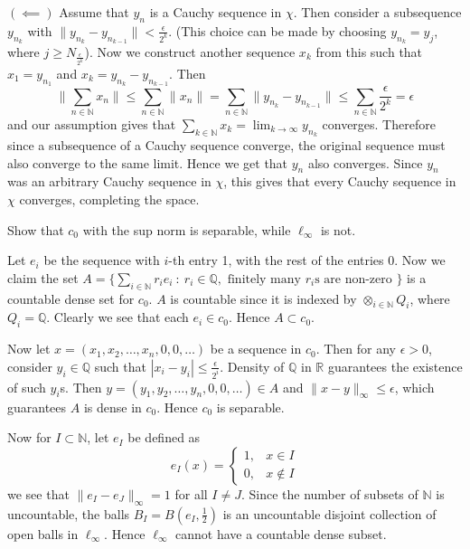 \documentclass[12pt]{exam}
\theoremstyle{plain} %
\theoremstyle{definition} %
\theoremstyle{remark} %
\begin{document}
\begin{questions}
\begin{solution}
    $(\impliedby)$ Assume that $y_n$ is a Cauchy sequence in $\chi$. Then consider a subsequence $y_{n_k}$ with $\|y_{n_{k}} - y_{n_{k-1}}\| < \frac{\epsilon}{2^k}$. (This choice can be made by choosing $y_{n_k} = y_j$, where $j \ge N_{\frac{\epsilon}{2^k}}$). Now we construct another sequence $x_k$ from this such that $ x_1 = y_{n_1}$ and $x_k = y_{n_k} - y_{n_{k-1}}$. Then \[
        \Big \|\sum_{n \in \mathbb{N}} x_n \Big\| \le \sum_{n \in \mathbb{N}} \|x_n\| = \sum_{n \in \mathbb{N}} \|y_{n_k} - y_{n_{k-1}}\| \le \sum_{n \in \mathbb{N}} \frac{\epsilon}{2^k} = \epsilon
    \]
     and our assumption gives that $\sum_{k \in \mathbb{N}} x_k = \lim_{k \to \infty} y_{n_k}$ converges. Therefore since a subsequence of a Cauchy sequence converge, the original sequence must also converge to the same limit. Hence we get that $y_n$ also converges. Since $y_n$ was an arbitrary Cauchy sequence in $\chi$, this gives that every Cauchy sequence in $ \chi$ converges, completing the space.
  \end{solution}

  \question
  Show that $c_0$ with the sup norm is separable, while $\ell_\infty$ is not.
  \begin{solution}
    Let $e_i$ be the sequence with $i$-th entry 1, with the rest of the entries $0$. Now we claim the set $A = \{ \sum_{i \in \mathbb{N}} r_i e_i \ : \ r_i \in \mathbb{Q}, \textrm{ finitely many $r_i$s are non-zero }\}$ is a countable dense set for $c_0$. $A$ is countable since it is indexed by $\otimes_{i \in \mathbb{N}} Q_i$, where $Q_i = \mathbb{Q}$. Clearly we see that each $e_i \in c_0$. Hence $A \subset c_0$. 

    Now let $x = (x_1, x_2, \ldots , x_n, 0, 0, \ldots)$ be a sequence in $c_0$. Then for any $\epsilon > 0$, consider $y_i \in \mathbb{Q}$ such that $|x_i - y_i| \le \frac{\epsilon}{2^i}$. Density of $\mathbb{Q}$ in $\mathbb{R}$ guarantees the existence of such $y_i$s. Then $y = (y_1, y_2, \ldots , y_n, 0, 0, \ldots) \in A$ and $\|x - y\|_\infty \le \epsilon$, which guarantees $A$ is dense in $c_0$. Hence $c_0$ is separable.

    Now for $I \subset \mathbb{N}$, let $e_I$ be defined as \[
      e_I(x) = \begin{cases}
        1, & x \in I \\ 
        0, & x \notin I
      \end{cases}
    \]
    we see that $\|e_I - e_J\|_\infty = 1$ for all $I \neq J$. Since the number of subsets of $\mathbb{N}$ is uncountable, the balls $B_I = B(e_I, \frac{1}{2})$ is an uncountable disjoint collection of open balls in $\ell_\infty$. Hence $\ell_\infty$ cannot have a countable dense subset.
  \end{solution}


\end{questions}
\end{document}
